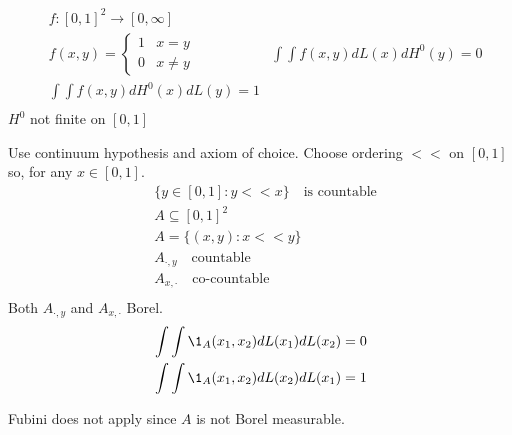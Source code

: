 \begin{example}[Example 2]
	\begin{align*}
		&f:[0,1]^2 \to [0,\infty] \\
		&f(x,y) = 
		\begin{cases}
			1 & x=y \\
			0 & x \neq y
		\end{cases}
		&\int \int f(x,y) dL(x) dH^{0} (y) = 0 \\
		&\int \int f(x,y) dH^{0}(x) dL (y) = 1 \\
	\end{align*} 
	$H^0$ not finite on $[0,1]$
\end{example}

\begin{example}[example 3]
	Use continuum hypothesis and axiom of choice. Choose ordering $<<$ on $[0,1]$ so, for any $x \in [0,1]$.
	\begin{align*}
		&\{ y \in [0,1] : y << x \} \quad \text{is countable} \\
		&A \subseteq [0,1]^2 \\
		&A = \{ (x,y) : x << y \} \\
		&A_{\cdot, y} \quad \text{countable}\\
		&A_{x, \cdot} \quad \text{co-countable}\\
	\end{align*} 
	Both $A_{\cdot, y}$ and $A_{x, \cdot}$ Borel.
	\begin{align*}
		&\int \int \1_{A} (x_1, x_2) dL(x_1) dL(x_2) = 0 \\
		&\int \int \1_{A} (x_1, x_2) dL(x_2) dL(x_1) = 1 \\
	\end{align*} 

	Fubini does not apply since $A$ is not Borel measurable.
\end{example}
